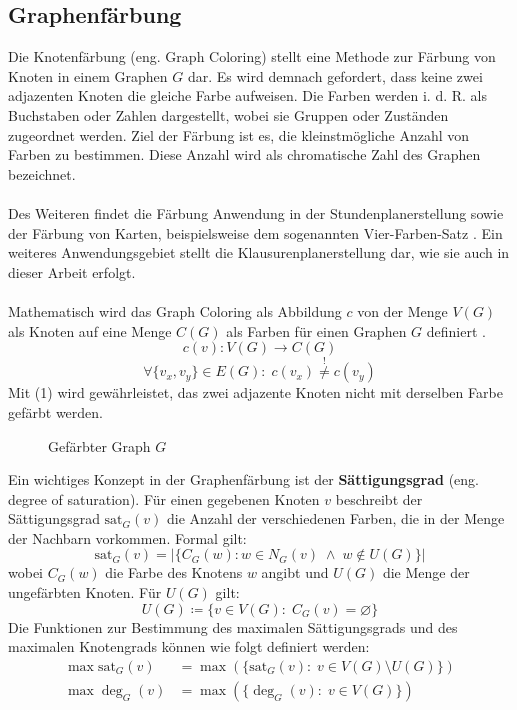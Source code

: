 \subsection{Graphenfärbung}
Die Knotenfärbung (eng. Graph Coloring) stellt eine Methode zur Färbung von Knoten in einem Graphen $G$ dar. 
Es wird demnach gefordert, dass keine zwei adjazenten Knoten die gleiche Farbe aufweisen.
Die Farben werden i. d. R. als Buchstaben oder Zahlen dargestellt, wobei sie Gruppen oder Zuständen zugeordnet werden.
Ziel der Färbung ist es, die kleinstmögliche Anzahl von Farben zu bestimmen.
Diese Anzahl wird als chromatische Zahl des Graphen bezeichnet.\\\\
Des Weiteren findet die Färbung Anwendung in der Stundenplanerstellung sowie der Färbung von Karten, beispielsweise dem sogenannten Vier-Farben-Satz \parencite{LdM_2017_VFS}.
Ein weiteres Anwendungsgebiet stellt die Klausurenplanerstellung dar, wie sie auch in dieser Arbeit erfolgt.\\\\
\newpage
\noindent Mathematisch wird das Graph Coloring als Abbildung $c$ von der Menge $V(G)$ als Knoten auf eine Menge $C(G)$ als Farben für einen Graphen $G$ definiert \parencite[121]{Diestel2017-bj}.
\begin{equation*}
c(v): V(G) \rightarrow C(G)
\end{equation*}
\begin{equation}
\forall \{v_x,v_y\} \in E(G) \colon \; c(v_x) \overset{!}{\neq} c(v_y)
\end{equation}
Mit (1) wird gewährleistet, das zwei adjazente Knoten nicht mit derselben Farbe gefärbt werden.
\vspace{-2.25cm}
\begin{figure}[H]
    \centering
    
    \vspace{-2cm}
    \caption{Gefärbter Graph $G$}
\end{figure}
\noindent Ein wichtiges Konzept in der Graphenfärbung ist der \textbf{Sättigungsgrad} (eng. degree of saturation). 
Für einen gegebenen Knoten $v$ beschreibt der Sättigungsgrad $\text{sat}_G(v)$ die Anzahl der verschiedenen Farben, die in der Menge der Nachbarn vorkommen\parencite[39]{lewis2021guide}. Formal gilt: 
\begin{equation*}
    \text{sat}_G(v)=|\{C_G(w)\colon w \in N_G(v) \; \wedge \; w \notin U(G)\}|
\end{equation*}
wobei $C_G(w)$ die Farbe des Knotens $w$ angibt und $U(G)$ die Menge der ungefärbten Knoten. Für $U(G)$ gilt:
\begin{equation*}
    U(G)\coloneqq \{v \in V(G) \colon \;C_G(v) = \varnothing\}
\end{equation*}
Die Funktionen zur Bestimmung des maximalen Sättigungsgrads und des maximalen Knotengrads können wie folgt definiert werden:
\begin{align*}
    \max \text{sat}_G(v) &= \max(\{\text{sat}_G(v)\colon \; v \in V(G) \setminus U(G)\})\\
    \max \deg_G(v) &= \max(\{\deg_G(v) \colon \; v \in V(G)\})
\end{align*}